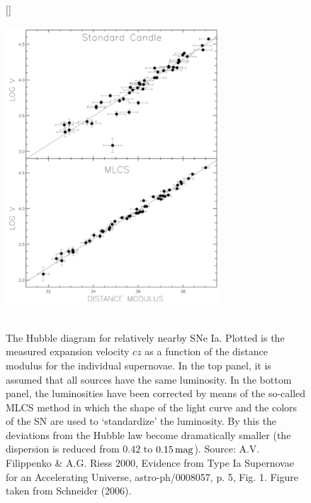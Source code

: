 \documentclass[a4paper,10pt]{article}
\begin{document}
\begin{figure}[t]
    [\FBwidth]
    {\caption{\footnotesize{\\The Hubble diagram for relatively nearby SNe Ia. Plotted is the measured expansion velocity $cz$ as a function of the distance modulus for the individual supernovae. In the top panel, it is assumed that all sources have the same luminosity. In the bottom panel, the luminosities have been corrected by means of the so-called MLCS method in which the shape of the light curve and the colors of the SN are used to `standardize' the luminosity. By this the deviations from the Hubble law become dramatically smaller (the dispersion is reduced from $0.42$ to $0.15\,{\rm mag}$). Source: A.V. Filippenko \& A.G. Riess 2000, Evidence from Type Ia Supernovae for an Accelerating Universe, astro-ph/0008057, p. 5, Fig. 1. Figure taken from Schneider (2006).}}
    \label{fig:sneia}}
    {\includegraphics[width=8cm]{figures/SNeIa.png}}
\end{figure}
\end{document}
